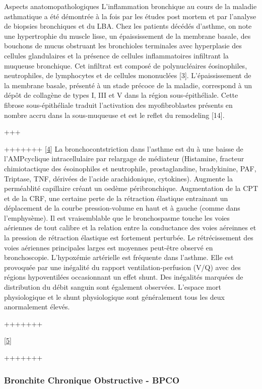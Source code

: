 \documentclass[12pt,]{article}
\begin{document}
Aspects anatomopathologiques L'inflammation bronchique au cours de la
maladie asthmatique a été démontrée à la fois par les études post mortem
et par l'analyse de biopsies bronchiques et du LBA. Chez les patients
décédés d'asthme, on note une hypertrophie du muscle lisse, un
épaississement de la membrane basale, des bouchons de mucus obstruant
les bronchioles terminales avec hyperplasie des cellules glandulaires et
la présence de cellules inflammatoires infiltrant la muqueuse
bronchique. Cet infiltrat est composé de polynucléaires éosinophiles,
neutrophiles, de lymphocytes et de cellules mononuclées {[}3{]}.
L'épaississement de la membrane basale, présenté à un stade précoce de
la maladie, correspond à un dépôt de collagène de types I, III et V dans
la région sous-épithéliale. Cette fibrose sous-épithéliale traduit
l'activation des myofibroblastes présents en nombre accru dans la
sous-muqueuse et est le reflet du remodeling {[}14{]}.

+++

+++++++ {[}\protect\hyperlink{ref-west1988physiopathologie}{4}{]} La
bronchocontstriction dans l'asthme est du à une baisse de l'AMPcyclique
intracellulaire par relargage de médiateur (Histamine, fracteur
chimiotactique des ésoinophiles et neutrophile, prostaglandine,
bradykinine, PAF, Triptase, TNF, dérivées de l'acide arachidonique,
cytokines). Augmente la perméablité capillaire créant un oedème
péribronchique. Augmentation de la CPT et de la CRF, une certaine perte
de la rétraction élastique entrainant un déplacement de la courbe
pression-volume en haut et à gauche (comme dans l'emphysème). Il est
vraisemblable que le bronchospasme touche les voies aériennes de tout
calibre et la relation entre la conductance des voies aéreinnes et la
pression de rétraction élastique est fortement perturbée. Le
rétrécissement des voies aériennes principales larges est moyennes
peut-être observé en bronchoscopie. L'hypoxémie artérielle est fréquente
dans l'asthme. Elle est provoquée par une inégalité du rapport
ventilation-perfusion (V/Q) avec des régions hypoventilées occasionnant
un effet shunt. Des inégalités marquées de distribution du débit sanguin
sont également observées. L'espace mort physiologique et le shunt
physiologique sont généralement tous les deux anormalement élevés.

+++++++

{[}\protect\hyperlink{ref-plantier2016mechanisms}{5}{]}

+++++++

\hypertarget{bronchite-chronique-obstructive---bpco}{%
\subsubsection{Bronchite Chronique Obstructive -
BPCO}\label{bronchite-chronique-obstructive---bpco}}
\end{document}
